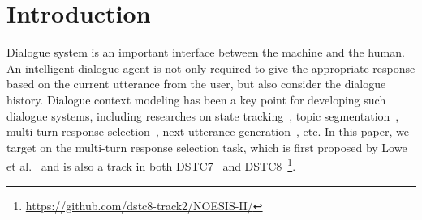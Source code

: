 \section{Introduction}

Dialogue system is an important interface between the machine and the human.  An intelligent dialogue agent is not only required to give the appropriate response based on the current utterance from the user, but also consider the dialogue history. Dialogue context modeling has been a key point for developing such dialogue systems, including researches on state tracking~\cite{abs-1907-01669,RenNM19}, topic segmentation~\cite{NanDNX19,kim2019dynamic}, multi-turn response selection~\cite{TaoWXHZY19,GuLL19}, next utterance generation~\cite{abs-1911-00536,ChenCQYW19}, etc. In this paper, we target on the multi-turn response selection task, which is first proposed by Lowe et al.~ and is also a track in both DSTC7~\cite{gunasekara2019dstc7} and DSTC8~\footnote{\url{https://github.com/dstc8-track2/NOESIS-II/}}.






